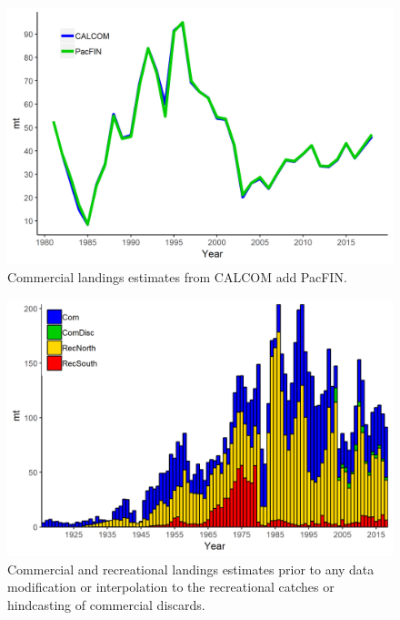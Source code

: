\documentclass[12pt,]{article}
\begin{document}
\begin{figure}
\centering
\includegraphics{Figures/Calcom_vs_Pacfin.png}
\caption{Commercial landings estimates from CALCOM add PacFIN.
\label{fig:Calcom_vs_Pacfin}}
\end{figure}

\begin{figure}
\centering
\includegraphics{Figures/Catches_original.png}
\caption{Commercial and recreational landings estimates prior to any
data modification or interpolation to the recreational catches or
hindcasting of commercial discards. \label{fig:Catches_original}}
\end{figure}
\end{document}
